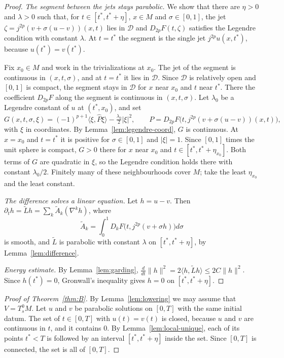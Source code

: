 \documentclass[11pt,reqno]{amsart}
\theoremstyle{definition}
\theoremstyle{remark}
\newcommand{\Dom}{\mathcal{D}}
\newcommand{\ip}[2]{\langle #1,#2\rangle}
\newcommand{\norm}[1]{\lVert #1\rVert}
\newcommand{\abs}[1]{\lvert #1\rvert}
\newcommand{\hatP}{\widehat{P}}
\newcommand{\uses}[1]{}
\numberwithin{equation}{section}
\begin{document}
\begin{proof}
\uses{lem:garding, lem:legendre-coord, fact:gronwall}
\emph{The segment between the jets stays parabolic.} We show that there are $\eta>0$ and $\lambda>0$
such that, for $t\in[t^*,t^*+\eta]$, $x\in M$ and $\sigma\in[0,1]$, the jet
$\zeta=j^{2p}(v+\sigma(u-v))(x,t)$ lies in $\Dom$ and $D_{2p}F(t,\zeta)$ satisfies the Legendre
condition with constant $\lambda$. At $t=t^*$ the segment is the single jet $j^{2p}u(x,t^*)$, because
$u(t^*)=v(t^*)$.

Fix $x_0\in M$ and work in the trivializations at $x_0$. The jet of the segment is continuous in
$(x,t,\sigma)$, and at $t=t^*$ it lies in $\Dom$. Since $\Dom$ is relatively open and $[0,1]$ is
compact, the segment stays in $\Dom$ for $x$ near $x_0$ and $t$ near $t^*$. There the coefficient
$D_{2p}F$ along the segment is continuous in $(x,t,\sigma)$. Let $\lambda_0$ be a Legendre constant of
$u$ at $(t^*,x_0)$, and set
\[
  G(x,t,\sigma,\xi)=(-1)^{p+1}\ip{\xi}{\hatP\xi}-\tfrac{\lambda_0}{2}\abs\xi^2,\qquad
  P=D_{2p}F\bigl(t,j^{2p}(v+\sigma(u-v))(x,t)\bigr),
\]
with $\xi$ in coordinates. By Lemma~\ref{lem:legendre-coord}, $G$ is continuous. At $x=x_0$ and $t=t^*$
it is positive for $\sigma\in[0,1]$ and $\abs\xi=1$. Since $[0,1]$ times the unit sphere is compact,
$G>0$ there for $x$ near $x_0$ and $t\in[t^*,t^*+\eta_{x_0}]$. Both terms of $G$ are quadratic in
$\xi$, so the Legendre condition holds there with constant $\lambda_0/2$. Finitely many of these
neighbourhoods cover $M$; take the least $\eta_{x_0}$ and the least constant.

\emph{The difference solves a linear equation.} Let $h=u-v$. Then
$\partial_th=\tilde Lh=\sum_k\tilde A_k(\nabla^kh)$, where
\[
  \tilde A_k=\int_0^1D_kF\bigl(t,j^{2p}(v+\sigma h)\bigr)d\sigma
\]
is smooth, and $\tilde L$ is parabolic with constant $\lambda$ on $[t^*,t^*+\eta]$, by
Lemma~\ref{lem:difference}.

\emph{Energy estimate.} By Lemma~\ref{lem:garding},
$\frac d{dt}\norm h^2=2\ip h{\tilde Lh}\le2C\norm h^2$. Since $h(t^*)=0$, Gronwall's inequality gives
$h=0$ on $[t^*,t^*+\eta]$.
\end{proof}

\begin{proof}[Proof of Theorem~\ref{thm:B}]
\uses{lem:lowering, lem:local-unique}
By Lemma~\ref{lem:lowering} we may assume that $V=T^0_sM$. Let $u$ and $v$ be parabolic solutions on
$[0,T]$ with the same initial datum. The set of $t\in[0,T]$ with $u(t)=v(t)$ is closed, because $u$
and $v$ are continuous in $t$, and it contains $0$. By Lemma~\ref{lem:local-unique}, each of its
points $t^*<T$ is followed by an interval $[t^*,t^*+\eta]$ inside the set. Since $[0,T]$ is
connected, the set is all of $[0,T]$.
\end{proof}
\end{document}
